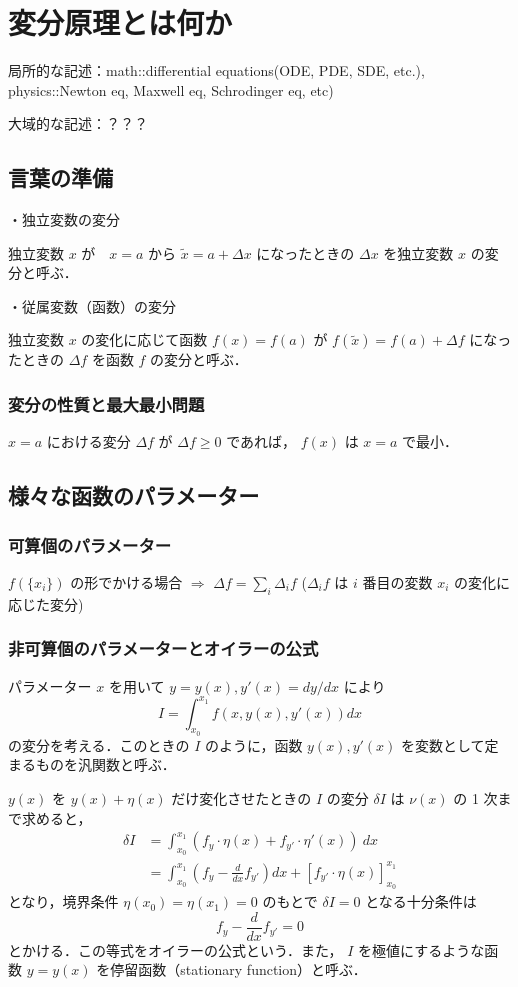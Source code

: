 \documentclass{jsarticle}
\begin{document}
\section{変分原理とは何か}
局所的な記述：math::differential equations(ODE, PDE, SDE, etc.), physics::Newton eq, Maxwell eq, Schrodinger eq, etc)

大域的な記述：？？？

\subsection{言葉の準備}
・独立変数の変分

独立変数 $x$ が　$x=a$ から $\tilde{x} = a+ \Delta x$ になったときの $\Delta x$ を独立変数 $x$ の変分と呼ぶ．

・従属変数（函数）の変分

独立変数 $x$ の変化に応じて函数 $f(x) = f(a)$ が $f(\tilde{x}) =f(a) +\Delta f$ になったときの $\Delta f$ を函数 $f$ の変分と呼ぶ．

\subsubsection{変分の性質と最大最小問題}
$x=a$ における変分 $\Delta f$ が $\Delta f \ge 0$ であれば， $f(x)$ は $x=a$ で最小．
\subsection{様々な函数のパラメーター}
\subsubsection{可算個のパラメーター}
$f(\{x_i\})$ の形でかける場合 $\Rightarrow$  $\Delta f = \sum_i \Delta_i f$ \quad ($\Delta_i f$ は $i$ 番目の変数 $x_i$ の変化に応じた変分)

\subsubsection{非可算個のパラメーターとオイラーの公式}
パラメーター $x$ を用いて $y=y(x), y'(x) =dy/dx$ により
\begin{equation}
I=\int_{x_0}^{x_1} f(x,y(x), y'(x)) dx
\end{equation}
の変分を考える．このときの $I$ のように，函数 $y(x), y'(x)$ を変数として定まるものを汎関数と呼ぶ．

$y(x)$ を $y(x) + \eta (x)$ だけ変化させたときの $I$ の変分 $\delta I$ は $\nu (x)$ の 1 次まで求めると，
\begin{eqnarray}
\delta I &= \int_{x_0}^{x_1} \left( f_y \cdot \eta (x) + f_{y'} \cdot \eta' (x)\right)\ dx  \nonumber \\
	   &= \int_{x_0}^{x_1} \left( f_y -\frac{d}{dx} f_{y'} \right) dx + \left[ f_{y'} \cdot \eta(x) \right]_{x_0}^{x_1}
\end{eqnarray}
となり，境界条件 $\eta(x_0) = \eta (x_1) =0$ のもとで $\delta I = 0$ となる十分条件は
\begin{equation}
f_y - \frac{d}{dx} f_{y'} =0
\end{equation} 
とかける．この等式をオイラーの公式という．また， $I$ を極値にするような函数 $y=y(x)$ を停留函数（stationary function）と呼ぶ．
\end{document}
